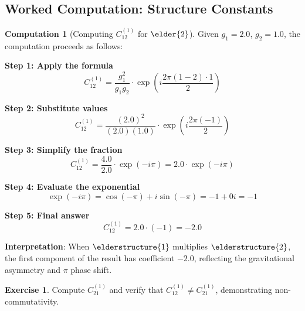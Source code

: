 \documentclass[12pt,a4paper]{article}
\theoremstyle{definition}
\newtheorem{exercise}{Exercise}[section]
\newtheorem{computation}{Computation}[section]
\theoremstyle{remark}
\begin{document}
\subsection{Worked Computation: Structure Constants}

\begin{computation}[Computing $C_{12}^{(1)}$ for $\elder{2}$]
Given $g_1 = 2.0$, $g_2 = 1.0$, the computation proceeds as follows:

\textbf{Step 1: Apply the formula}
$$C_{12}^{(1)} = \frac{g_1^2}{g_1 g_2} \cdot \exp\left(i\frac{2\pi(1-2) \cdot 1}{2}\right)$$

\textbf{Step 2: Substitute values}
$$C_{12}^{(1)} = \frac{(2.0)^2}{(2.0)(1.0)} \cdot \exp\left(i\frac{2\pi(-1)}{2}\right)$$

\textbf{Step 3: Simplify the fraction}
$$C_{12}^{(1)} = \frac{4.0}{2.0} \cdot \exp\left(-i\pi\right) = 2.0 \cdot \exp(-i\pi)$$

\textbf{Step 4: Evaluate the exponential}
$$\exp(-i\pi) = \cos(-\pi) + i\sin(-\pi) = -1 + 0i = -1$$

\textbf{Step 5: Final answer}
$$C_{12}^{(1)} = 2.0 \cdot (-1) = -2.0$$

\textbf{Interpretation}: When $\elderstructure{1}$ multiplies $\elderstructure{2}$, the first component of the result has coefficient $-2.0$, reflecting the gravitational asymmetry and $\pi$ phase shift.
\end{computation}

\begin{exercise}
Compute $C_{21}^{(1)}$ and verify that $C_{12}^{(1)} \neq C_{21}^{(1)}$, demonstrating non-commutativity.
\end{exercise}
\end{document}
